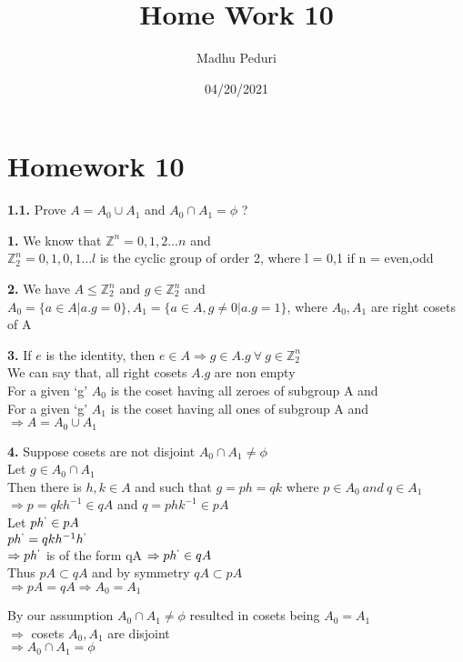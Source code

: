 \documentclass [12pt]{article}
\title{Home Work 10}
\author{Madhu Peduri}
\date{04/20/2021}
\theoremstyle{definition}
\newcommand{\iz}[1]{\mathds{#1}^{n}}
\begin{document}
\section*{Homework 10}

{\bf 1.1.} Prove $A = A_{0} \cup A_{1}$ and $A_{0} \cap A_{1}=\phi$ ?

\phantom{1em} {\bf 1.} We know that $\iz{Z} = {0,1,2 \dots n}$ and \\
\phantom{1000em} $\iz{Z}_{2} = {0,1,0,1 \dots l}$ is the cyclic group of order 2, where l = 0,1 if n = even,odd

\phantom{1em} {\bf 2.} We have $A \leq \iz{Z}_{2}$ and $g \in \iz{Z}_{2}$ and \\
\phantom{1000em} $A_{0} = \{a \in A|a.g=0\}, A_{1} = \{a \in A, g \neq 0|a.g=1 \}$, where $A_{0}, A_{1}$ are right cosets of A

\phantom{1em} {\bf 3.} If $e$ is the identity, then $e \in A\Rightarrow g \in A.g\ \forall\ g \in \iz{Z}_{2}$\\
\phantom{1000em} We can say that, all right cosets $A.g$ are non empty \\
\phantom{1000em} For a given `g' $A_{0}$ is the coset having all zeroes of subgroup A and\\
\phantom{1000em} For a given `g' $A_{1}$ is the coset having all ones of subgroup A and\\
\phantom{1000em} $\Rightarrow A = A_{0} \cup A_{1}$ 

\phantom{1em} {\bf 4.} Suppose cosets are not disjoint $A_{0} \cap A_{1} \neq \phi$ \\
\phantom{1000em} Let $g \in A_{0} \cap A_{1}$\\
\phantom{1000em} Then there is $h,k \in A$ and  such that $g = ph = qk$ where $p \in A_{0} \ and \ q \in A_{1}$\\
\phantom{1000em} $\Rightarrow p=qkh^{-1} \in qA$ and $q=phk^{-1} \in pA$\\
\phantom{1000em} Let $ph^{`} \in pA$\\
\phantom{1000em} $ph^{`} = qkh^{-1}h^{`}$ \\
\phantom{1000em} $\Rightarrow ph^{`}$ is of the form qA $\Rightarrow ph^{`} \in qA$\\
\phantom{1000em} Thus $pA \subset qA$ and by symmetry $qA \subset pA$\\
\phantom{1000em} $\Rightarrow pA = qA \Rightarrow A_{0} = A_{1}$

\phantom{1000em} By our assumption $A_{0} \cap A_{1} \neq \phi$ resulted in cosets being $A_{0} = A_{1}$\\
\phantom{1000em} $\Rightarrow$ cosets $A_{0}, A_{1}$ are disjoint \\
\phantom{1000em} $\Rightarrow A_{0} \cap A_{1}=\phi$
\end{document}
